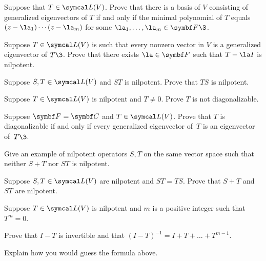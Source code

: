 \begin{exercises}
\exercise
Suppose that $T \in \L(V)$. Prove that there is a basis of $V$ consisting of generalized eigenvectors of $T$ if and only if the minimal polynomial of $T$ equals $(z-\la_1) \cdots (z-\la_m)$ for some
$\la_1, \ldots, \la_m \in \F{}\3$.\label{8geneigb}

\pagebreak[1]


\exercise
Suppose $T \in \L(V)$ is such that every nonzero vector in $V$ is a generalized eigenvector of $T\3$. Prove that there exists $\la \in \F{}$ such that
$T - \la I$ is nilpotent.


\exercise
Suppose $S, T \in \L(V)$ and $ST$ is nilpotent. Prove that $TS$ is nilpotent.


\exercise
Suppose $T \in \L(V)$ is nilpotent and $T \ne 0$. Prove $T$ is not diagonalizable.


\exercise
Suppose $\F{} = \C{}$ and $T \in \L(V)$. Prove that $T$ is diagonalizable if and only if every generalized eigenvector of~$T$ is an eigenvector of~$T\3$.\label{425} 


\exercise
\begin{SUBtheorem}
\item
Give an example of nilpotent operators $S, T$ on the same vector space such that neither $S+T$ nor $ST$ is nilpotent.
\item
Suppose $S, T \in \L(V)$ are nilpotent and $ST = TS$. Prove that $S + T$ and $ST$ are nilpotent.
\end{SUBtheorem}


\exercise
Suppose $T \in \L(V)$ is nilpotent and $m$ is a positive integer such that $T^m = 0$.
\begin{subtheorem}
\item
Prove that $I-T$ is invertible and that
$
(I - T)^{-1} = I + T + \dots + T^{m-1}\!$.
\item
Explain how you would guess the formula above.
\end{subtheorem}
\exercisesubtheoremend



\end{exercises}
